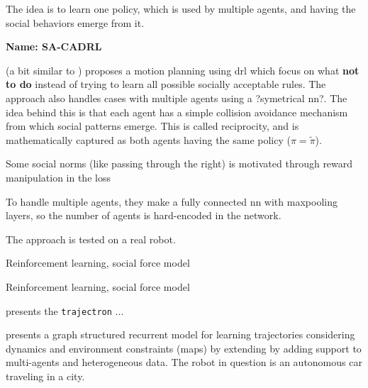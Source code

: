 The idea is to learn one policy, which is used by multiple agents, and having the social behaviors emerge from it.




\textbf{Name: SA-CADRL}

\cite{chen2017socially} (a bit similar to \cite{chen2017decentralized}) proposes a motion planning using \gls{drl} which focus on what \textbf{not to do} instead of trying to learn all possible socially acceptable rules.
%
The approach also handles cases with multiple agents using a ?symetrical \gls{nn}?.
%
The idea behind this is that each agent has a simple collision avoidance mechanism from which social patterns emerge.
%
This is called reciprocity, and is mathematically captured as both agents having the same policy ($\pi = \tilde{\pi}$).

Some social norms (like passing through the right) is motivated through reward manipulation in the loss 

To handle multiple agents, they make a fully connected \gls{nn} with maxpooling layers, so the number of agents is hard-encoded in the network.

The approach is tested on a real robot.



\cite{everett2018motion} Reinforcement learning, social force model


\cite{long2018towards} Reinforcement learning, social force model


\cite{ivanovic2019trajectron} presents the \texttt{trajectron} ...


\cite{salzmann2020trajectron++}  presents a graph structured recurrent model for learning trajectories considering dynamics and environment constraints (maps) by extending \cite{ivanovic2019trajectron} by adding support to multi-agents and heterogeneous data. The robot in question is an autonomous car traveling in a city.

